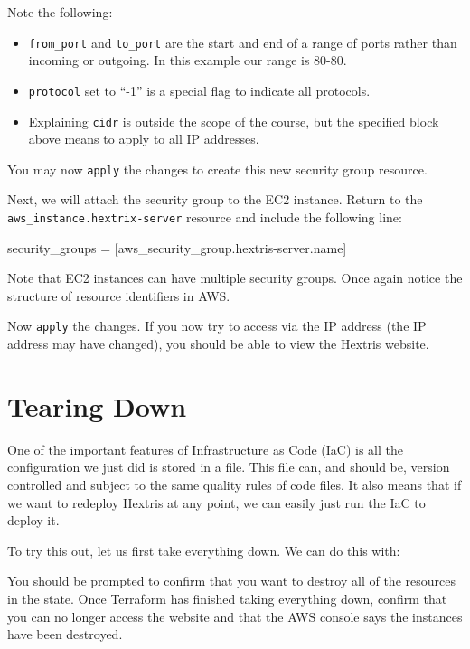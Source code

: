 \documentclass{csse4400}
\begin{document}
Note the following:
\begin{itemize}
  \item \texttt{from\_port} and \texttt{to\_port} are the start and end of a range of ports rather than incoming or outgoing. In this example our range is 80-80.
  \item \texttt{protocol} set to ``-1'' is a special flag to indicate all protocols.
  \item Explaining \texttt{cidr} is outside the scope of the course, but the specified block above means to apply to all IP addresses.
\end{itemize}

You may now \texttt{apply} the changes to create this new security group resource.

Next, we will attach the security group to the EC2 instance.
Return to the \texttt{aws\_instance.hextrix-server} resource
and include the following line:

\begin{code}[language=terraform,numbers=none]{}
security_groups = [aws_security_group.hextris-server.name]
\end{code}

Note that EC2 instances can have multiple security groups.
Once again notice the structure of resource identifiers in AWS.


Now \texttt{apply} the changes.
If you now try to access via the IP address
(the IP address may have changed),
you should be able to view the Hextris website.


\section{Tearing Down}

One of the important features of Infrastructure as Code (IaC) is all the configuration we just did is stored in a file.
This file can, and should be, version controlled and subject to the same quality rules of code files.
It also means that if we want to redeploy Hextris at any point,
we can easily just run the IaC to deploy it.

To try this out, let us first take everything down.
We can do this with:

You should be prompted to confirm that you want to destroy all of the resources in the state.
Once Terraform has finished taking everything down,
confirm that you can no longer access the website and that the AWS console says the instances have been destroyed.
\end{document}
